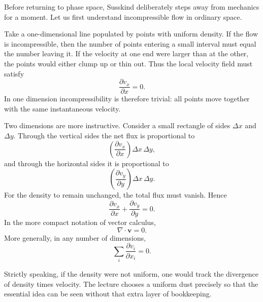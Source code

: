 Before returning to phase space, Susskind deliberately steps away from mechanics for a moment. Let us first understand incompressible flow in ordinary space.

Take a one-dimensional line populated by points with uniform density. If the flow is incompressible, then the number of points entering a small interval must equal the number leaving it. If the velocity at one end were larger than at the other, the points would either clump up or thin out. Thus the local velocity field must satisfy
\begin{equation}
\frac{\partial v_x}{\partial x}=0.
\end{equation}
In one dimension incompressibility is therefore trivial: all points move together with the same instantaneous velocity.

Two dimensions are more instructive. Consider a small rectangle of sides \(\Delta x\) and \(\Delta y\). Through the vertical sides the net flux is proportional to
\[
\left(\frac{\partial v_x}{\partial x}\right)\Delta x\,\Delta y,
\]
and through the horizontal sides it is proportional to
\[
\left(\frac{\partial v_y}{\partial y}\right)\Delta x\,\Delta y.
\]
For the density to remain unchanged, the total flux must vanish. Hence
\begin{equation}
\frac{\partial v_x}{\partial x}+\frac{\partial v_y}{\partial y}=0.
\end{equation}
In the more compact notation of vector calculus,
\begin{equation}
\nabla\cdot \mathbf v = 0.
\end{equation}
More generally, in any number of dimensions,
\begin{equation}
\sum_i \frac{\partial v_i}{\partial x_i}=0.
\end{equation}

Strictly speaking, if the density were not uniform, one would track the divergence of density times velocity. The lecture chooses a uniform dust precisely so that the essential idea can be seen without that extra layer of bookkeeping.

